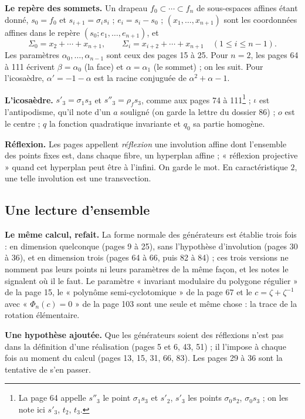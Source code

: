 \documentclass[11pt,a4paper]{article}
\begin{document}
\textbf{Le repère des sommets.} Un drapeau $f_0 \subset \cdots \subset f_n$ de
sous-espaces affines étant donné, $s_0 = f_0$ et $s_{i+1} = \sigma_i s_i$ ;
$e_i = s_i - s_0$ ; $(x_1, \dots, x_{n+1})$ sont les coordonnées affines dans le
repère $(s_0; e_1, \dots, e_{n+1})$, et
\[
\Sigma_0 = x_2 + \cdots + x_{n+1}, \qquad
\Sigma_i = x_{i+2} + \cdots + x_{n+1} \quad (1 \leq i \leq n-1) .
\]
Les paramètres $\alpha_0, \dots, \alpha_{n-1}$ sont ceux des pages 15 à 25.
Pour $n = 2$, les pages 64 à 111 écrivent $\beta = \alpha_0$ (la face) et
$\alpha = \alpha_1$ (le sommet) ; on les suit. Pour l'icosaèdre, $\alpha' = -1
- \alpha$ est la racine conjuguée de $\alpha^2 + \alpha - 1$.

\textbf{L'icosaèdre.} $s'_3 = \sigma_1 s_3$ et $s''_3 = \rho_f s_3$, comme
aux pages 74 à 111\footnote{La page 64 appelle $s''_3$ le point $\sigma_1 s_3$
et $s'_2$, $s'_3$ les points $\sigma_0 s_2$, $\sigma_0 s_3$ ; on les note ici
$s'_3$, $t_2$, $t_3$.} ; $\iota$ est l'antipodisme, qu'il note d'un $a$
souligné (on garde la lettre du dossier 86) ; $o$ est le centre ; $q$ la
fonction quadratique invariante et $q_0$ sa partie homogène.

\textbf{Réflexion.} Les pages appellent \emph{réflexion} une involution
affine dont l'ensemble des points fixes est, dans chaque fibre, un hyperplan
affine ; « réflexion projective » quand cet hyperplan peut être à l'infini. On
garde le mot. En caractéristique $2$, une telle involution est une
transvection.

\subsection*{Une lecture d'ensemble}

\textbf{Le même calcul, refait.} La forme normale des générateurs est établie
trois fois : en dimension quelconque (pages 9 à 25), sans l'hypothèse
d'involution (pages 30 à 36), et en dimension trois (pages 64 à 66, puis 82 à
84) ; ces trois versions ne nomment pas leurs points ni leurs paramètres de la
même façon, et les notes le signalent où il le faut. Le paramètre
« invariant modulaire du polygone régulier » de la page 15, le
« polynôme semi-cyclotomique » de la page 67 et le $c = \zeta + \zeta^{-1}$
avec « $\Phi_n(c) = 0$ » de la page 103 sont une seule et même chose : la
trace de la rotation élémentaire.

\textbf{Une hypothèse ajoutée.} Que les générateurs soient des réflexions
n'est pas dans la définition d'une réalisation (pages 5 et 6, 43, 51) ; il
l'impose à chaque fois au moment du calcul (pages 13, 15, 31, 66, 83). Les
pages 29 à 36 sont la tentative de s'en passer.
\end{document}
